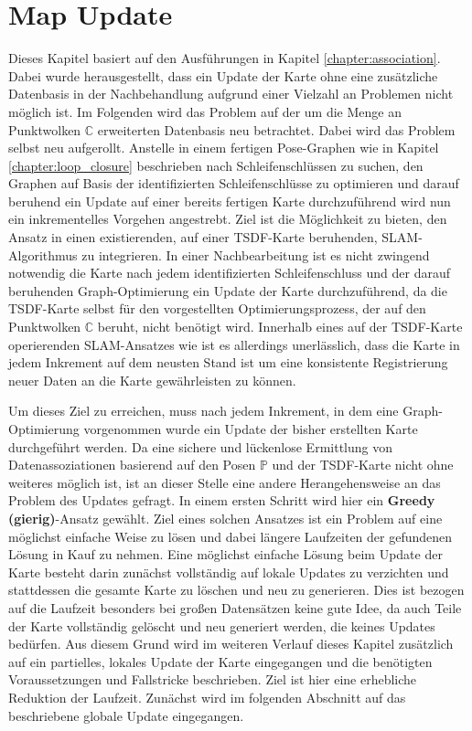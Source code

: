 \chapter{Map Update}
\label{chapter:map_update}

Dieses Kapitel basiert auf den Ausführungen in Kapitel \ref{chapter:association}. Dabei wurde herausgestellt, dass ein Update der Karte ohne eine zusätzliche Datenbasis in der Nachbehandlung aufgrund einer Vielzahl an Problemen nicht möglich ist. Im Folgenden wird das Problem auf der um die Menge an Punktwolken $\mathbb{C}$ erweiterten Datenbasis neu betrachtet. Dabei wird das Problem selbst neu aufgerollt. Anstelle in einem fertigen Pose-Graphen wie in Kapitel \ref{chapter:loop_closure} beschrieben nach Schleifenschlüssen zu suchen, den Graphen auf Basis der identifizierten Schleifenschlüsse zu optimieren und darauf beruhend ein Update auf einer bereits fertigen Karte durchzuführend wird nun ein inkrementelles Vorgehen angestrebt. Ziel ist die Möglichkeit zu bieten, den Ansatz in einen existierenden, auf einer TSDF-Karte beruhenden, SLAM-Algorithmus zu integrieren. In einer Nachbearbeitung ist es nicht zwingend notwendig die Karte nach jedem identifizierten Schleifenschluss und der darauf beruhenden Graph-Optimierung ein Update der Karte durchzuführend, da die TSDF-Karte selbst für den vorgestellten Optimierungsprozess, der auf den Punktwolken $\mathbb{C}$ beruht, nicht benötigt wird. Innerhalb eines auf der TSDF-Karte operierenden SLAM-Ansatzes wie \cite{HATSDF} ist es allerdings unerlässlich, dass die Karte in jedem Inkrement auf dem neusten Stand ist um eine konsistente Registrierung neuer Daten an die Karte gewährleisten zu können.

Um dieses Ziel zu erreichen, muss nach jedem Inkrement, in dem eine Graph-Optimierung vorgenommen wurde ein Update der bisher erstellten Karte durchgeführt werden. Da eine sichere und lückenlose Ermittlung von Datenassoziationen basierend auf den Posen $\mathbb{P}$ und der TSDF-Karte nicht ohne weiteres möglich ist, ist an dieser Stelle eine andere Herangehensweise an das Problem des Updates gefragt. In einem ersten Schritt wird hier ein \textbf{Greedy (gierig)}-Ansatz gewählt. Ziel eines solchen Ansatzes ist ein Problem auf eine möglichst einfache Weise zu lösen und dabei längere Laufzeiten der gefundenen Lösung in Kauf zu nehmen. Eine möglichst einfache Lösung beim Update der Karte besteht darin zunächst vollständig auf lokale Updates zu verzichten und stattdessen die gesamte Karte zu löschen und neu zu generieren. Dies ist bezogen auf die Laufzeit besonders bei großen Datensätzen keine gute Idee, da auch Teile der Karte vollständig gelöscht und neu generiert werden, die keines Updates bedürfen. Aus diesem Grund wird im weiteren Verlauf dieses Kapitel zusätzlich auf ein partielles, lokales Update der Karte eingegangen und die benötigten Voraussetzungen und Fallstricke beschrieben. Ziel ist hier eine erhebliche Reduktion der Laufzeit. Zunächst wird im folgenden Abschnitt auf das beschriebene globale Update eingegangen.


